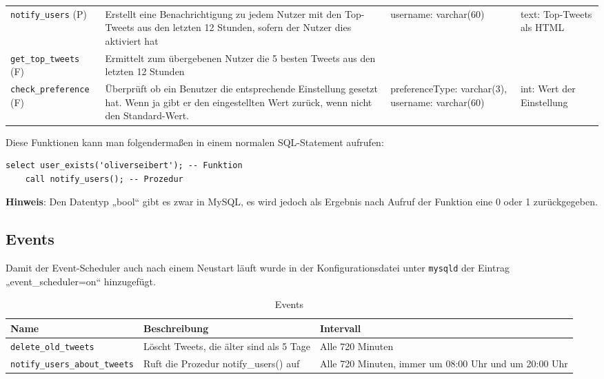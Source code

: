 \begin{table}[!ht]
\begin{tabular}{p{3.3cm}p{5.4cm}p{3.2cm}p{1.8cm}}
 	 \texttt{notify\_users} (P) & Erstellt eine Benachrichtigung zu jedem Nutzer mit den Top-Tweets aus den letzten 12 Stunden, sofern der Nutzer dies aktiviert hat & username: \newline varchar(60) & text: \newline Top-Tweets als HTML \\
    \texttt{get\_top\_tweets} (F) & Ermittelt zum übergebenen Nutzer die 5 besten Tweets aus den letzten 12 Stunden & &  \\
    \texttt{check\_preference} (F) & Überprüft ob ein Benutzer die entsprechende Einstellung gesetzt hat. Wenn ja gibt er den eingestellten Wert zurück, wenn nicht den Standard-Wert.  & preferenceType: \newline varchar(3), \newline username: \newline varchar(60) & int: \newline Wert der \newline Einstellung \\
	\bottomrule
  \end{tabular}
\end{table}
\newpage
Diese Funktionen kann man folgendermaßen in einem normalen \acs{SQL}-Statement 
aufrufen:

\begin{lstlisting}[style=SQL]
	select user_exists('oliverseibert'); -- Funktion 
	call notify_users(); -- Prozedur
\end{lstlisting} 
\bigskip
\textbf{Hinweis}: Den Datentyp „bool“ gibt es zwar in MySQL, es wird jedoch als Ergebnis nach Aufruf der Funktion eine 0 oder 1 zurückgegeben.


\subsection{Events}

Damit der Event-Scheduler auch nach einem Neustart läuft wurde in der Konfigurationsdatei unter 
\texttt{mysqld} der Eintrag „event\_scheduler=on“ hinzugefügt.

\begin{table}[!ht]
\caption{Events}
  \begin{tabular}{p{4.8cm}p{4.4cm}p{4.6cm}}
    \toprule 
    \textbf{Name} & \textbf{Beschreibung} & \textbf{Intervall} \\
    \hline 
    \texttt{delete\_old\_tweets} & Löscht Tweets, die älter sind als 5 Tage & Alle 720 Minuten \\
    \texttt{notify\_users\_about\_tweets} & Ruft die Prozedur notify\_users() auf & Alle 720 Minuten, immer um 08:00 Uhr und um 20:00 Uhr \\
	\bottomrule
  \end{tabular}
\end{table}

